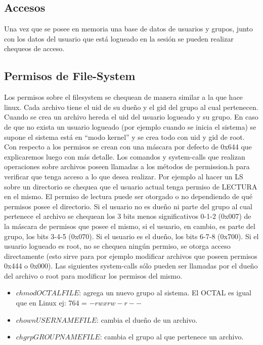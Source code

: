 \documentclass[english]{article}
\begin{document}
 
\subsection{Accesos}
Una vez que se posee en memoria una base de datos de usuarios y grupos, junto con los datos del usuario que está logueado en la sesión se pueden realizar chequeos de acceso.

\subsection {Permisos de File-System}
Los permisos sobre el filesystem se chequean de manera similar a la que hace linux. Cada archivo tiene el uid de su dueño y el gid del grupo al cual pertenecen.
Cuando se crea un archivo hereda el uid del usuario logueado y su grupo. En caso de que no exista un usuario logueado (por ejemplo cuando se inicia el sistema) se supone el sistema está en “modo kernel” y se crea todo con uid y gid de root. Con respecto a los permisos se crean con una máscara por defecto de 0x644 que explicaremos luego con más detalle.
Los comandos y system-calls que realizan operaciones sobre archivos poseen llamadas a los métodos de permission.h para verificar que tenga acceso a lo que desea realizar. Por ejemplo al hacer un LS sobre un directorio se chequea que el usuario actual tenga permiso de LECTURA en el mismo. El permiso de lectura puede ser otorgado o no dependiendo de qué permisos posee el directorio.
Si el usuario no es dueño ni parte del grupo al cual pertenece el archivo se chequean los 3 bits menos significativos 0-1-2 (0x007) de la máscara de permisos que posee el mismo, si el usuario, en cambio, es parte del grupo, los bits 3-4-5 (0x070). Si el usuario es el dueño, los bits 6-7-8 (0x700).
Si el usuario logueado es root, no se chequea ningún permiso, se otorga acceso directamente (esto sirve para por ejemplo modificar archivos que poseen permisos 0x444 o 0x000).
Las siguientes system-calls sólo pueden ser llamadas por el dueño del archivo o root para modificar los permisos del mismo.
\begin{itemize}
\item $chmod OCTAL FILE$: agrega un nuevo grupo al sistema.
\subitem El OCTAL es igual que en Linux ej: 764 = $-rwxrw-r--$
\item $chown USERNAME FILE$: cambia el dueño de un archivo.
\item $chgrp GROUPNAME FILE$: cambia el grupo al que pertenece un archivo.
\end{itemize}
 
\end{document}

